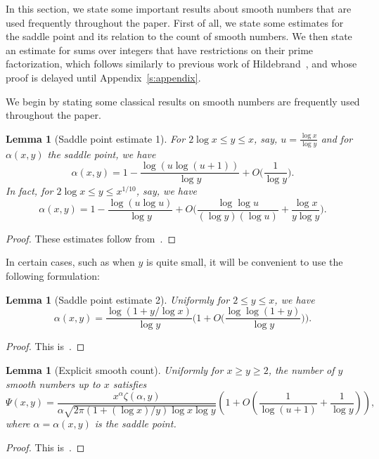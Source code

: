 \documentclass[12pt,a4paper,reqno]{amsart}
\numberwithin{equation}{section}
\def\leq {\leqslant}
\newtheorem{lemma}[theorem]{Lemma}
\theoremstyle{remark}
\theoremstyle{definition}
\numberwithin{equation}{section}
\theoremstyle{remark}
\begin{document}
In this section, we state some important results about smooth numbers that are used frequently throughout the paper. First of all, we state some estimates for the saddle point and its relation to the count of smooth numbers. We then state an estimate for sums over integers that have restrictions on their prime factorization, which follows similarly to previous work of Hildebrand~\cite{HildTen86}, and whose proof is delayed until Appendix~\ref{s:appendix}.

We begin by stating some classical results on smooth numbers are frequently used throughout the paper. 

\begin{lemma}[Saddle point estimate 1]\label{l:saddle point approx}  
For $2 \log x \leq y \leq x$, say, $u= \frac{\log x}{\log y}$ and for $\alpha(x, y)$ the saddle point, we have
\[
\alpha (x,y) = 1 - \frac{\log (u \log (u + 1))}{\log y} + O \biggl( \frac{1}{\log y} \biggr).
\] 
In fact, for $2 \log x \leq y \leq x^{1/10}$, say, we have 
\[
\alpha (x,y) = 1 - \frac{\log (u \log u)}{\log y} + O \biggl( \frac{\log \log u}{(\log y) (\log u)} + \frac{\log x}{y \log y}\biggr).
\] 
\end{lemma}
\begin{proof}
These estimates follow from~\cite[Lemmas~1 and~2]{HildTen86}.
\end{proof}
In certain cases, such as when $y$ is quite small, it will be convenient to use the following formulation:
\begin{lemma}[Saddle point estimate 2]\label{l:saddle point approx uniform}  
Uniformly for $2 \leq y \leq x$, we have
\[
\alpha (x,y) = \frac{\log ( 1 + y/\log x )}{\log y} \biggl( 1 + O \biggl( \frac{\log \log (1+y)}{\log y} \biggr) \biggr).
\] 
\end{lemma}
\begin{proof}
This is~\cite[Theorem~2]{HildTen86}.
\end{proof}

\begin{lemma}[Explicit smooth count]\label{l:smooth count in terms of saddle point}
Uniformly for $x \geq y \geq 2$, the number of $y$ smooth numbers up to $x$ satisfies
\[
\Psi(x, y)=\frac{x^\alpha \zeta(\alpha, y)}{\alpha \sqrt{2 \pi(1+(\log x) / y) \log x \log y}}\left(1+O\left(\frac{1}{\log (u+1)}+\frac{1}{\log y}\right)\right),
\]
where $\alpha = \alpha (x,y)$ is the saddle point.
\end{lemma}
\begin{proof}
This is~\cite[Theorem~1]{HildTen86}.
\end{proof}
\end{document}
